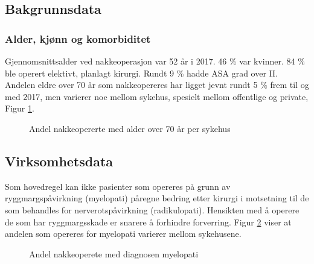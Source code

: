 \documentclass [norsk,a4paper,twoside]{article}\usepackage[]{graphicx}\usepackage[]{color}
\begin{document}
                  
                  \subsection{Bakgrunnsdata}
            

                  \subsubsection{Alder, kjønn og komorbiditet}
            Gjennomsnittsalder ved nakkeoperasjon var 52 år i 2017. 46 \% var kvinner. 84 \% ble operert elektivt, planlagt kirurgi. Rundt  9 \% hadde ASA grad over II. Andelen eldre over 70 år som nakkeopereres har ligget jevnt rundt 5 \% frem til og med 2017, men varierer noe mellom sykehus, spesielt mellom offentlige og private, Figur \ref{fig:NakkeAlder70Sh}.
            
            
            \begin{figure}[ht]
            \caption{\label{fig:NakkeAlder70Sh} Andel nakkeopererte med alder over 70 år per sykehus}
            \end{figure}
            
            \subsection{Virksomhetsdata}
            
            Som hovedregel kan ikke pasienter som opereres på grunn av ryggmargspåvirkning (myelopati) påregne bedring etter kirurgi i motsetning til de som behandles for nerverotspåvirkning (radikulopati). Hensikten med å operere de som har ryggmargsskade er snarere å forhindre forverring. Figur \ref{fig:NakkeOprIndikMyelopatiSh} viser at andelen som opereres for myelopati varierer mellom sykehusene.
            
            \begin{figure}[ht]
            \caption{\label{fig:NakkeOprIndikMyelopatiSh} Andel nakkeoperete med diagnosen myelopati}
            \end{figure}
            
            
\end{document}

